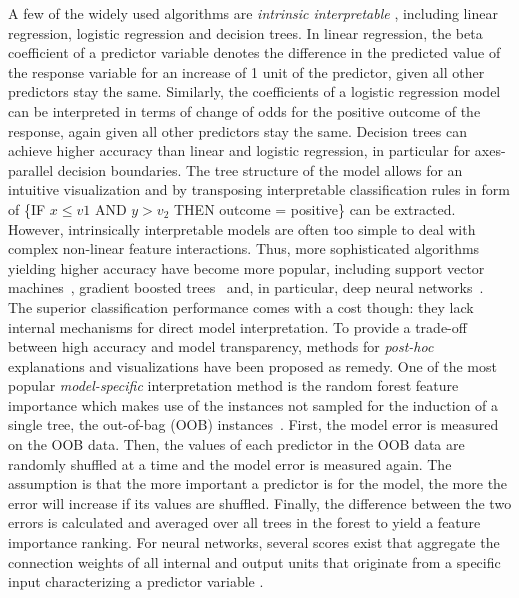 \documentclass[
]{book}
\begin{document}
A few of the widely used algorithms are \emph{intrinsic interpretable} \autocite{Lipton:ICML2015}, including linear regression, logistic regression and decision trees.
In linear regression, the beta coefficient of a predictor variable denotes the difference in the predicted value of the response variable for an increase of 1 unit of the predictor, given all other predictors stay the same.
Similarly, the coefficients of a logistic regression model can be interpreted in terms of change of odds for the positive outcome of the response, again given all other predictors stay the same.
Decision trees can achieve higher accuracy than linear and logistic regression, in particular for axes-parallel decision boundaries.
The tree structure of the model allows for an intuitive visualization and by transposing interpretable classification rules in form of \{IF \(x \leq v1\) AND \(y>v_2\) THEN outcome = positive\} can be extracted.
However, intrinsically interpretable models are often too simple to deal with complex non-linear feature interactions.
Thus, more sophisticated algorithms yielding higher accuracy have become more popular, including support vector machines~\autocite{Boser:SVM1992}, gradient boosted trees~\autocite{Friedman:PDP2001} and, in particular, deep neural networks~\autocite{Goodfellow:DL2016}.
The superior classification performance comes with a cost though: they lack internal mechanisms for direct model interpretation.
To provide a trade-off between high accuracy and model transparency, methods for \emph{post-hoc} explanations and visualizations have been proposed as remedy.
One of the most popular \emph{model-specific} interpretation method is the random forest feature importance which makes use of the instances not sampled for the induction of a single tree, the out-of-bag (OOB) instances~\autocite{Breiman:RandomForests2001}. First, the model error is measured on the OOB data. Then, the values of each predictor in the OOB data are randomly shuffled at a time and the model error is measured again.
The assumption is that the more important a predictor is for the model, the more the error will increase if its values are shuffled.
Finally, the difference between the two errors is calculated and averaged over all trees in the forest to yield a feature importance ranking.
For neural networks, several scores exist that aggregate the connection weights of all internal and output units that originate from a specific input characterizing a predictor variable \autocite{Olden:NNInterpretation2004}.
\end{document}
